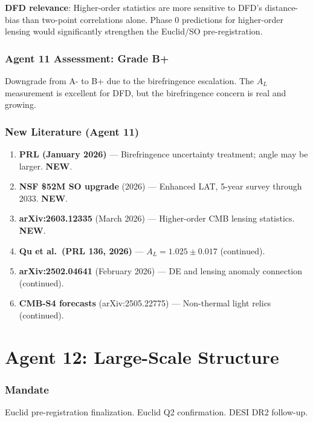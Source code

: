 \documentclass[11pt,a4paper]{article}
\newcommand{\NEW}{\textcolor{dfdblue}{\textbf{NEW}}}
\begin{document}
\textbf{DFD relevance}: Higher-order statistics are more sensitive to DFD's distance-bias than two-point correlations alone. Phase 0 predictions for higher-order lensing would significantly strengthen the Euclid/SO pre-registration.

\section{Agent 11 Assessment: Grade B+}

Downgrade from A- to B+ due to the birefringence escalation. The $A_L$ measurement is excellent for DFD, but the birefringence concern is real and growing.

\section{New Literature (Agent 11)}

\begin{enumerate}
\item \textbf{PRL (January 2026)} --- Birefringence uncertainty treatment; angle may be larger. \NEW.
\item \textbf{NSF \$52M SO upgrade} (2026) --- Enhanced LAT, 5-year survey through 2033. \NEW.
\item \textbf{arXiv:2603.12335} (March 2026) --- Higher-order CMB lensing statistics. \NEW.
\item \textbf{Qu et al.\ (PRL 136, 2026)} --- $A_L = 1.025 \pm 0.017$ (continued).
\item \textbf{arXiv:2502.04641} (February 2026) --- DE and lensing anomaly connection (continued).
\item \textbf{CMB-S4 forecasts} (arXiv:2505.22775) --- Non-thermal light relics (continued).
\end{enumerate}


\part{Agent 12: Large-Scale Structure}
\label{part:agent12}

\section{Mandate}

Euclid pre-registration finalization. Euclid Q2 confirmation. DESI DR2 follow-up.
\end{document}
